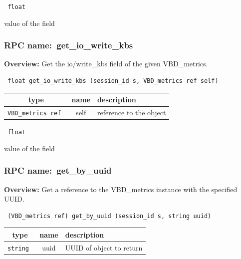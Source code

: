 \vspace{0.3cm}

{\tt 
float
}


value of the field
\vspace{0.3cm}
\vspace{0.3cm}
\vspace{0.3cm}
\subsubsection{RPC name:~get\_io\_write\_kbs}

{\bf Overview:} 
Get the io/write\_kbs field of the given VBD\_metrics.

\begin{verbatim} float get_io_write_kbs (session_id s, VBD_metrics ref self)\end{verbatim}



 
\vspace{0.3cm}
\begin{tabular}{|c|c|p{7cm}|}
 \hline
{\bf type} & {\bf name} & {\bf description} \\ \hline
{\tt VBD\_metrics ref } & self & reference to the object \\ \hline 

\end{tabular}

\vspace{0.3cm}

{\tt 
float
}


value of the field
\vspace{0.3cm}
\vspace{0.3cm}
\vspace{0.3cm}
\subsubsection{RPC name:~get\_by\_uuid}

{\bf Overview:} 
Get a reference to the VBD\_metrics instance with the specified UUID.

\begin{verbatim} (VBD_metrics ref) get_by_uuid (session_id s, string uuid)\end{verbatim}



 
\vspace{0.3cm}
\begin{tabular}{|c|c|p{7cm}|}
 \hline
{\bf type} & {\bf name} & {\bf description} \\ \hline
{\tt string } & uuid & UUID of object to return \\ \hline 

\end{tabular}


